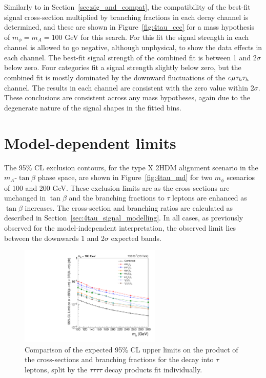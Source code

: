 Similarly to in Section~\ref{sec:sig_and_compat}, the compatibility of the best-fit signal cross-section multiplied by branching fractions in each decay channel is determined, and these are shown in Figure~\ref{fig:4tau_ccc} for a mass hypothesis of $m_{\phi}=m_{A}=100$ GeV for this search.
For this fit the signal strength in each channel is allowed to go negative, although unphysical, to show the data effects in each channel.
The best-fit signal strength of the combined fit is between 1 and 2$\sigma$ below zero.
Four categories fit a signal strength slightly below zero, but the combined fit is mostly dominated by the downward fluctuations of the $e\mu\tau_{h}\tau_{h}$ channel.
The results in each channel are consistent with the zero value within 2$\sigma$.
These conclusions are consistent across any mass hypotheses, again due to the degenerate nature of the signal shapes in the fitted bins.

\section{Model-dependent limits}

The 95\% \ac{CL} exclusion contours, for the type X \ac{2HDM} alignment scenario in the $m_A$-$\tan\beta$ phase space, are shown in Figure~\ref{fig:4tau_md} for two $m_{\phi}$ scenarios of 100 and 200 GeV.
These exclusion limits are  as the cross-sections are unchanged in $\tan\beta$ and the branching fractions to $\tau$ leptons are enhanced as $\tan\beta$ increases.
The cross-section and branching ratios are calculated as described in Section~\ref{sec:4tau_signal_modelling}.
In all cases, as previously observed for the model-independent interpretation, the observed limit lies between the downwards 1 and 2$\sigma$ expected bands. \\


\begin{figure}[!hbtp]
\centering
    \includegraphics[width=0.6\textwidth]{Figures/limit_comparison_4tau.pdf}
\caption[Plot of the expected model-independent limits split by the $\tau\tau\tau\tau$ decay channels.]{Comparison of the expected 95\% CL upper limits on the product of the cross-sections and branching fractions for the decay into $\tau$ leptons, split by the $\tau\tau\tau\tau$ decay products fit individually.}
\label{fig:4tau_limit_comparison}
\end{figure}

